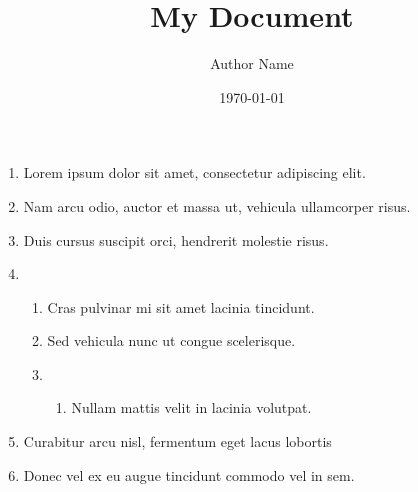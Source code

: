\documentclass{article}
\title{My Document}\author{Author Name}\date{\today}
\begin{document}
\begin{enumerate}
\item 
Lorem ipsum dolor sit amet, consectetur adipiscing elit. 
\item 
Nam arcu odio, auctor et massa ut, vehicula ullamcorper risus. 
\item 
Duis cursus suscipit orci, hendrerit molestie risus. 
\item[] 
\begin{enumerate}
\item 
Cras pulvinar mi sit amet lacinia tincidunt.
\item 
Sed vehicula nunc ut congue scelerisque. 
\item[] 
\begin{enumerate}
\item 
Nullam mattis velit in lacinia volutpat.

\end{enumerate}

\end{enumerate}
\item 
Curabitur arcu nisl, fermentum eget lacus lobortis
\item 
Donec vel ex eu augue tincidunt commodo vel in sem.

\end{enumerate}
\end{document}
